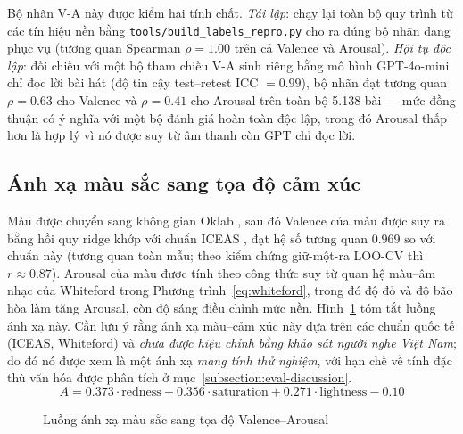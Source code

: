\documentclass[../DoAn.tex]{subfiles}
\begin{document}
Bộ nhãn V-A này được kiểm hai tính chất. \textit{Tái lập}: chạy lại toàn bộ quy trình từ các tín hiệu nền bằng \texttt{tools/build\_labels\_repro.py} cho ra đúng bộ nhãn đang phục vụ (tương quan Spearman $\rho = 1.00$ trên cả Valence và Arousal). \textit{Hội tụ độc lập}: đối chiếu với một bộ tham chiếu V-A sinh riêng bằng mô hình GPT-4o-mini chỉ đọc lời bài hát (độ tin cậy test--retest ICC $= 0.99$), bộ nhãn đạt tương quan $\rho = 0.63$ cho Valence và $\rho = 0.41$ cho Arousal trên toàn bộ 5.138 bài --- mức đồng thuận có ý nghĩa với một bộ đánh giá hoàn toàn độc lập, trong đó Arousal thấp hơn là hợp lý vì nó được suy từ âm thanh còn GPT chỉ đọc lời.

\subsection{Ánh xạ màu sắc sang tọa độ cảm xúc}
\label{subsection:4.2.2}
Màu được chuyển sang không gian Oklab \cite{ottosson2020oklab}, sau đó Valence của màu được suy ra bằng hồi quy ridge khớp với chuẩn ICEAS \cite{jonauskaite2020universal}, đạt hệ số tương quan 0.969 so với chuẩn này (tương quan toàn mẫu; theo kiểm chứng giữ-một-ra LOO-CV thì $r \approx 0.87$). Arousal của màu được tính theo công thức suy từ quan hệ màu--âm nhạc của Whiteford \cite{whiteford2018color} trong Phương trình~\eqref{eq:whiteford}, trong đó độ đỏ và độ bão hòa làm tăng Arousal, còn độ sáng điều chỉnh mức nền. Hình~\ref{fig:color-flow} tóm tắt luồng ánh xạ này. Cần lưu ý rằng ánh xạ màu--cảm xúc này dựa trên các chuẩn quốc tế (ICEAS, Whiteford) và \textit{chưa được hiệu chỉnh bằng khảo sát người nghe Việt Nam}; do đó nó được xem là một ánh xạ \textit{mang tính thử nghiệm}, với hạn chế về tính đặc thù văn hóa được phân tích ở mục~\ref{subsection:eval-discussion}.
\begin{equation}\label{eq:whiteford}
    A = 0.373 \cdot \text{redness} + 0.356 \cdot \text{saturation} + 0.271 \cdot \text{lightness} - 0.10
\end{equation}

\begin{figure}[tbp]
\centering
{}
\caption{Luồng ánh xạ màu sắc sang tọa độ Valence--Arousal}
\label{fig:color-flow}
\end{figure}
\end{document}
